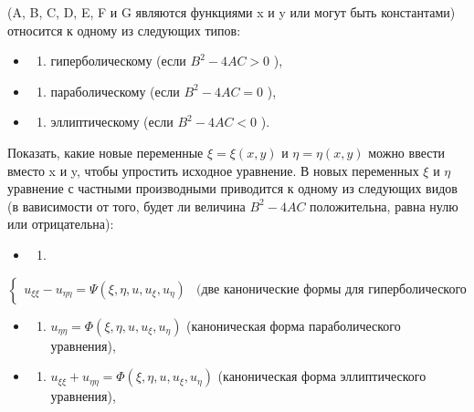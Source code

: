 \documentclass[
  ukrainian,
]{article}
\providecommand{\tightlist}{%
  \setlength{\itemsep}{0pt}\setlength{\parskip}{0pt}}
\begin{document}
(A, B, C, D, E, F и G являются функциями x и y или могут быть
константами) относится к одному из следующих типов:

\begin{itemize}
\tightlist
\item
  \begin{enumerate}
  \def\labelenumi{\arabic{enumi})}
  \tightlist
  \item
    гиперболическому (если \(B^2 - 4AC > 0\) ),
  \end{enumerate}
\item
  \begin{enumerate}
  \def\labelenumi{\arabic{enumi})}
  \setcounter{enumi}{1}
  \tightlist
  \item
    параболическому (если \(B^2 - 4AC = 0\) ),
  \end{enumerate}
\item
  \begin{enumerate}
  \def\labelenumi{\arabic{enumi})}
  \setcounter{enumi}{2}
  \tightlist
  \item
    эллиптическому (если \(B^2 - 4AC < 0\) ).
  \end{enumerate}
\end{itemize}

Показать, какие новые переменные \(\xi = \xi(x, y)\) и
\(\eta = \eta(x, y)\) можно ввести вместо x и y, чтобы упростить
исходное уравнение. В новых переменных \(\xi\) и \(\eta\) уравнение с
частными производными приводится к одному из следующих видов (в
вависимости от того, будет ли величина \(B^2 - 4AC\) положительна, равна
нулю или отрицательна):

\begin{itemize}
\tightlist
\item
  \begin{enumerate}
  \def\labelenumi{\arabic{enumi}.}
  \tightlist
  \item
  \end{enumerate}
\end{itemize}

\[
\begin{cases} u_{\xi\xi} - u_{\eta\eta} = \Psi(\xi, \eta, u, u_{\xi}, u_{\eta}) & \text{(две канонические формы для гиперболического уравнения),} \end{cases}
\]

\begin{itemize}
\tightlist
\item
  \begin{enumerate}
  \def\labelenumi{\arabic{enumi}.}
  \setcounter{enumi}{1}
  \tightlist
  \item
    \(u_{\eta\eta} = \Phi(\xi, \eta, u, u_{\xi}, u_{\eta})\)
    (каноническая форма параболического уравнения),
  \end{enumerate}
\item
  \begin{enumerate}
  \def\labelenumi{\arabic{enumi}.}
  \setcounter{enumi}{2}
  \tightlist
  \item
    \(u_{\xi\xi} + u_{\eta\eta} = \Phi(\xi, \eta, u, u_{\xi}, u_{\eta})\)
    (каноническая форма эллиптического уравнения),
  \end{enumerate}
\end{itemize}
\end{document}
